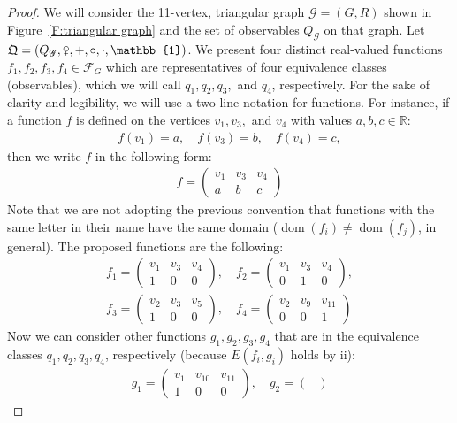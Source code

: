\documentclass{scrartcl}
\DeclareMathOperator{\dom}{dom}
\newcommand{\FQ}{\mathfrak{Q}}
\newcommand{\SF}{\mathscr{F}}
\newcommand{\SG}{\mathscr{G}}
\newcommand{\BR}{\mathbb{R}}
\newcommand{\com}{\mathrel{\venus}}
\begin{document}
\begin{examples}
\begin{enumerate}[(1)]
\begin{proof}
We will consider the 11-vertex, triangular graph $\SG=(G,R)$ shown in Figure~\ref{F:triangular graph} and the set of observables $Q_{\SG}$ on that graph. Let $\FQ=(Q_{\SG},\com,+,\circ,\cdot,\mathbb{1})$. We present four distinct real-valued functions $f_1,f_2,f_3,f_4\in\SF_G$ which are representatives of four equivalence classes (observables), which we will call $q_1,q_2,q_3,$ and $q_4$, respectively. For the sake of clarity and legibility, we will use a two-line notation for functions. For instance, if a function $f$ is defined on the vertices $v_1,v_3,$ and $v_4$ with values $a,b,c\in\BR$:
\begin{align*}
f(v_1)=a,\quad f(v_3)=b,\quad f(v_4)=c,
\end{align*}
then we write $f$ in the following form:
\begin{align*}
f=\begin{pmatrix}
v_1 & v_3 & v_4\\
a & b & c
\end{pmatrix}
\end{align*}
Note that we are not adopting the previous convention that functions with the same letter in their name have the same domain ($\dom(f_i)\ne\dom(f_j)$, in general). The proposed functions are the following:
\begin{align*}
f_1=\begin{pmatrix}
v_1 & v_3 & v_4\\
1 & 0 & 0
\end{pmatrix},\quad f_2=\begin{pmatrix}
v_1 & v_3 & v_4\\
0 & 1 & 0
\end{pmatrix},\\
f_3=\begin{pmatrix}
v_2 & v_3 & v_5\\
1 & 0 & 0
\end{pmatrix},\quad f_4=\begin{pmatrix}
v_2 & v_9 & v_{11}\\
0 & 0 & 1
\end{pmatrix}
\end{align*}
Now we can consider other functions $g_1,g_2,g_3,g_4$ that are in the equivalence classes $q_1,q_2,q_3,q_4$, respectively (because $E(f_i,g_i)$ holds by ii):
\begin{align*}
g_1=\begin{pmatrix}
v_1 & v_{10} & v_{11}\\
1 & 0 & 0
\end{pmatrix},\quad g_2=\begin{pmatrix}

\end{pmatrix}
\end{align*}
\end{proof}
\end{enumerate}
\end{examples}
\end{document}
